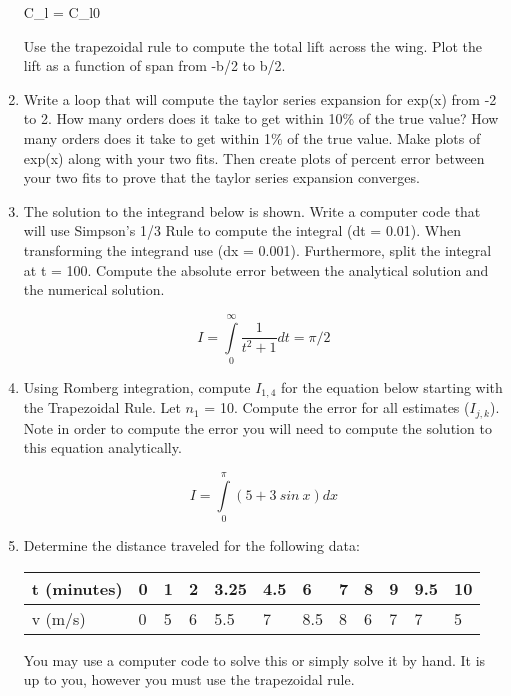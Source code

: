 \begin{enumerate}
  \beq
  C_{l} = C_{l0}
  \eeq

  Use the trapezoidal rule to compute the total lift across the
  wing. Plot the lift as a function of span from -b/2 to b/2. 

\item Write a loop that will compute the taylor series expansion for
  exp(x) from -2 to 2. How many orders does it take to get within 10\%
  of the true value? How many orders does it take to get within 1\% of
  the true value. Make plots of exp(x) along with your two fits. Then
  create plots of percent error between your two fits to prove that
  the taylor series expansion converges.  

\item The solution to the integrand below is shown. Write a computer
  code that will use Simpson's 1/3 Rule to compute the integral (dt =
  0.01). When transforming the integrand use (dx = 0.001). Furthermore,
  split the integral at t = 100. Compute the absolute error between
  the analytical solution and the numerical solution.  

\begin{equation}
I = \int\limits_{0}^{\infty} \frac{1}{t^2+1} dt = \pi/2
\end{equation}

\item Using Romberg integration, compute $I_{1,4}$ for the equation
  below starting with the Trapezoidal Rule. Let $n_1$ = 10. Compute
  the error for all estimates ($I_{j,k}$). Note in order to compute
  the error you will need to compute the solution to this equation
  analytically. 

\begin{equation}
  I = \int\limits_{0}^{\pi} (5 + 3~sin~x) dx
\end{equation}

\item Determine the distance traveled for the following data:

\begin{center}
\begin{tabular}{l | l l l l l l l l l l l}
t (minutes) & 0 & 1 & 2 & 3.25 & 4.5 & 6 & 7 & 8 & 9 & 9.5 & 10 \\
\hline
v (m/s) & 0 & 5 & 6 & 5.5 & 7 & 8.5 & 8 & 6 & 7 & 7 & 5 
\end{tabular}
\end{center}

You may use a computer code to solve this or simply solve it by
hand. It is up to you, however you must use the trapezoidal rule.


\end{enumerate}
